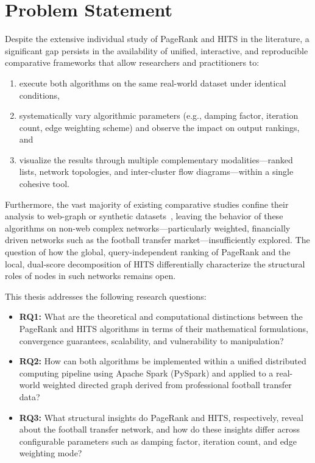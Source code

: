 \section{Problem Statement}
\label{sec:problem_statement}

Despite the extensive individual study of PageRank and HITS in the literature, a significant gap persists in the availability of unified, interactive, and reproducible comparative frameworks that allow researchers and practitioners to:
\begin{enumerate}[label=(\alph*)]
    \item execute both algorithms on the same real-world dataset under identical conditions,
    \item systematically vary algorithmic parameters (e.g., damping factor, iteration count, edge weighting scheme) and observe the impact on output rankings, and
    \item visualize the results through multiple complementary modalities---ranked lists, network topologies, and inter-cluster flow diagrams---within a single cohesive tool.
\end{enumerate}

Furthermore, the vast majority of existing comparative studies confine their analysis to web-graph or synthetic datasets~\cite{ijarcce_comparative, ijert_comparative, ijca_hits_pagerank_2024}, leaving the behavior of these algorithms on non-web complex networks---particularly weighted, financially driven networks such as the football transfer market---insufficiently explored. The question of how the global, query-independent ranking of PageRank and the local, dual-score decomposition of HITS differentially characterize the structural roles of nodes in such networks remains open.

This thesis addresses the following research questions:

\begin{itemize}
    \item \textbf{RQ1:} What are the theoretical and computational distinctions between the PageRank and HITS algorithms in terms of their mathematical formulations, convergence guarantees, scalability, and vulnerability to manipulation?
    \item \textbf{RQ2:} How can both algorithms be implemented within a unified distributed computing pipeline using Apache Spark (PySpark) and applied to a real-world weighted directed graph derived from professional football transfer data?
    \item \textbf{RQ3:} What structural insights do PageRank and HITS, respectively, reveal about the football transfer network, and how do these insights differ across configurable parameters such as damping factor, iteration count, and edge weighting mode?
\end{itemize}


